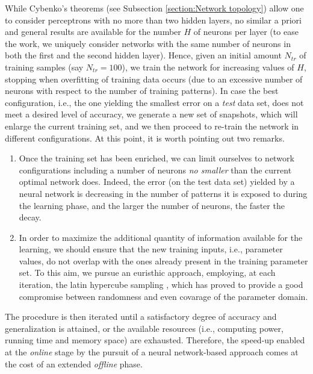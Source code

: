 \documentclass{elsarticle}
\numberwithin{equation}{section}
\theoremstyle{theorem}
\theoremstyle{definition}
\theoremstyle{remark}
\theoremstyle{proposition}
\numberwithin{figure}{section}
\begin{document}
		While Cybenko's theorems (see Subsection \ref{section:Network topology}) allow one to consider perceptrons with no more than two hidden layers, no similar a priori and general results are available for the number $H$ of neurons per layer (to ease the work, we uniquely consider networks with the same number of neurons in both the first and the second hidden layer). Hence, given an initial amount $N_{tr}$ of training samples (say $N_{tr} = 100$), we train the network for increasing values of $H$, stopping when overfitting of training data occurs (due to an excessive number of neurons with respect to the number of training patterns). In case the best configuration, i.e., the one yielding the smallest error on a \emph{test} data set, does not meet a desired level of accuracy, we generate a new set of snapshots, which will enlarge the current training set, and we then proceed to re-train the network in different configurations. At this point, it is worth pointing out two remarks. 
		\begin{enumerate}[label=(\roman*)]
			\vspace*{-0.1cm}
			\item Once the training set has been enriched, we can limit ourselves to network configurations including a number of neurons \emph{no smaller} than the current optimal network does. Indeed, the error (on the test data set) yielded by a neural network is decreasing in the number of patterns it is exposed to during the learning phase, and the larger the number of neurons, the faster the decay.
			\item In order to maximize the additional quantity of information available for the learning, we should ensure that the new training inputs, i.e., parameter values, do not overlap with the ones already present in the training parameter set. To this aim, we pursue an euristhic approach, employing, at each iteration, the latin hypercube sampling \cite{Imam08}, which has proved to provide a good compromise between randomness and even covarage of the parameter domain. %
		\end{enumerate} 
		\vspace*{-0.1cm}
		The procedure is then iterated until a satisfactory degree of accuracy and generalization is attained, or the available resources (i.e., computing power, running time and memory space) are exhausted. Therefore, the speed-up enabled at the \emph{online} stage by the pursuit of a neural network-based approach comes at the cost of an extended \emph{offline} phase. 
		
\end{document}
